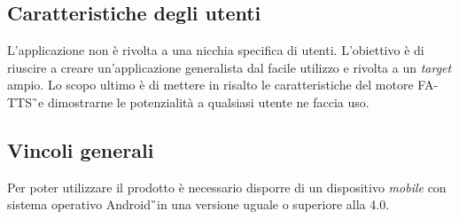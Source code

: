 \subsection{Caratteristiche degli utenti}
L'applicazione non è rivolta a una nicchia specifica di utenti. L'obiettivo è di riuscire a creare un'applicazione generalista dal facile utilizzo e rivolta a un \textit{target} ampio. Lo scopo ultimo è di mettere in risalto le caratteristiche del motore FA-TTS\G\ e dimostrarne le potenzialità a qualsiasi utente ne faccia uso. 

\subsection{Vincoli generali}
Per poter utilizzare il prodotto è necessario disporre di un dispositivo \textit{mobile} con sistema operativo Android\G\ in una versione uguale o superiore alla 4.0.

\newpage